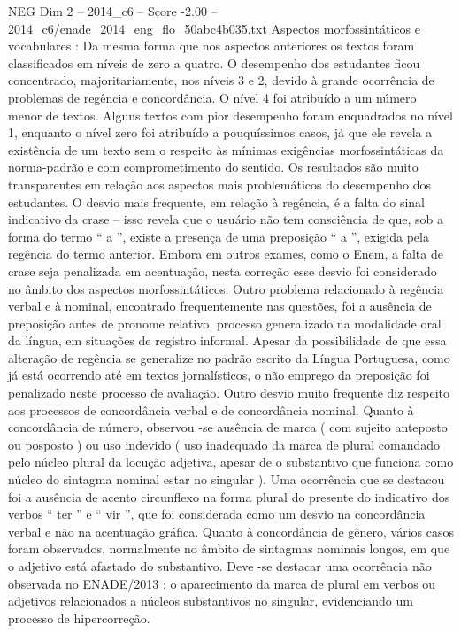 \begin{textsample}{NEG Dim 2 – 2014\_c6 – Score -2.00 – 2014\_c6/enade\_2014\_eng\_flo\_50abc4b035.txt}
Aspectos morfossintáticos e vocabulares : Da mesma forma que nos aspectos anteriores os textos foram classificados em níveis de zero a quatro.
O desempenho dos estudantes ficou concentrado, majoritariamente, nos níveis 3 e 2, devido à grande ocorrência de problemas de regência e concordância.
O nível 4 foi atribuído a um número menor de textos.
Alguns textos com pior desempenho foram enquadrados no nível 1, enquanto o nível zero foi atribuído a pouquíssimos casos, já que ele revela a existência de um texto sem o respeito às mínimas exigências morfossintáticas da norma-padrão e com comprometimento do sentido.
Os resultados são muito transparentes em relação aos aspectos mais problemáticos do desempenho dos estudantes.
O desvio mais frequente, em relação à regência, é a falta do sinal indicativo da crase – isso revela que o usuário não tem consciência de que, sob a forma do termo “ a ”, existe a presença de uma preposição “ a ”, exigida pela regência do termo anterior.
Embora em outros exames, como o Enem, a falta de crase seja penalizada em acentuação, nesta correção esse desvio foi considerado no âmbito dos aspectos morfossintáticos.
Outro problema relacionado à regência verbal e à nominal, encontrado frequentemente nas questões, foi a ausência de preposição antes de pronome relativo, processo generalizado na modalidade oral da língua, em situações de registro informal.
Apesar da possibilidade de que essa alteração de regência se generalize no padrão escrito da Língua Portuguesa, como já está ocorrendo até em textos jornalísticos, o não emprego da preposição foi penalizado neste processo de avaliação.
Outro desvio muito frequente diz respeito aos processos de concordância verbal e de concordância nominal.
Quanto à concordância de número, observou -se ausência de marca ( com sujeito anteposto ou posposto ) ou uso indevido ( uso inadequado da marca de plural comandado pelo núcleo plural da locução adjetiva, apesar de o substantivo que funciona como núcleo do sintagma nominal estar no singular ).
Uma ocorrência que se destacou foi a ausência de acento circunflexo na forma plural do presente do indicativo dos verbos “ ter ” e “ vir ”, que foi considerada como um desvio na concordância verbal e não na acentuação gráfica.
Quanto à concordância de gênero, vários casos foram observados, normalmente no âmbito de sintagmas nominais longos, em que o adjetivo está afastado do substantivo.
Deve -se destacar uma ocorrência não observada no ENADE/2013 : o aparecimento da marca de plural em verbos ou adjetivos relacionados a núcleos substantivos no singular, evidenciando um processo de hipercorreção.

\end{textsample}
